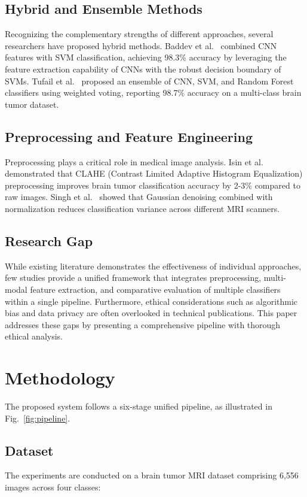 \documentclass[conference]{IEEEtran}
\begin{document}
\subsection{Hybrid and Ensemble Methods}
Recognizing the complementary strengths of different approaches, several researchers have proposed hybrid methods. Baddev et al.~\cite{baddev2021} combined CNN features with SVM classification, achieving 98.3\% accuracy by leveraging the feature extraction capability of CNNs with the robust decision boundary of SVMs. Tufail et al.~\cite{tufail2022} proposed an ensemble of CNN, SVM, and Random Forest classifiers using weighted voting, reporting 98.7\% accuracy on a multi-class brain tumor dataset.

\subsection{Preprocessing and Feature Engineering}
Preprocessing plays a critical role in medical image analysis. Isin et al.~\cite{isin2016} demonstrated that CLAHE (Contrast Limited Adaptive Histogram Equalization) preprocessing improves brain tumor classification accuracy by 2-3\% compared to raw images. Singh et al.~\cite{singh2020} showed that Gaussian denoising combined with normalization reduces classification variance across different MRI scanners.

\subsection{Research Gap}
While existing literature demonstrates the effectiveness of individual approaches, few studies provide a unified framework that integrates preprocessing, multi-modal feature extraction, and comparative evaluation of multiple classifiers within a single pipeline. Furthermore, ethical considerations such as algorithmic bias and data privacy are often overlooked in technical publications. This paper addresses these gaps by presenting a comprehensive pipeline with thorough ethical analysis.


\section{Methodology}
\label{sec:methodology}

The proposed system follows a six-stage unified pipeline, as illustrated in Fig.~\ref{fig:pipeline}.

\subsection{Dataset}
\label{subsec:dataset}
The experiments are conducted on a brain tumor MRI dataset comprising 6,556 images across four classes:
\end{document}
